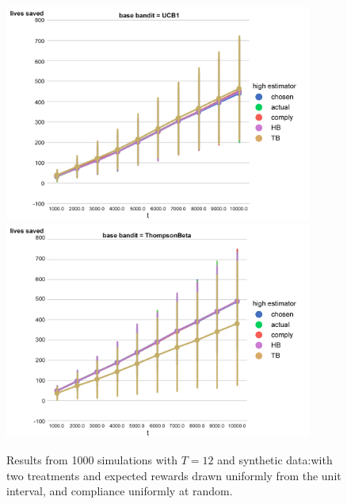 \begin{figure}[t]
	\centering	
	\includegraphics[width=0.9\textwidth]{bandit/figs/ex3-1.jpg}\hspace{1cm}
	\includegraphics[width=0.9\textwidth]{bandit/figs/ex3-2.jpg}\hspace{1cm}
	\caption{Results from 1000 simulations with $T=12$ and synthetic data:with two treatments and expected rewards drawn uniformly from the unit interval, and compliance uniformly at random.}	
	\end{figure}
